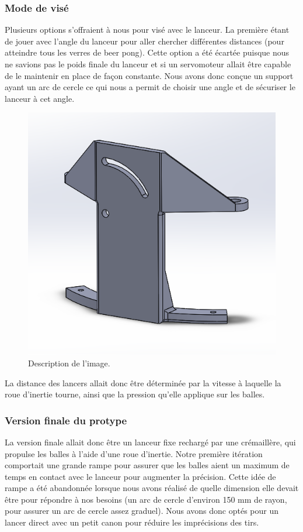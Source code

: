 \subsubsection{Mode de visé}
Plusieurs options s’offraient à nous pour visé avec le lanceur.
La première étant de jouer avec l’angle du lanceur pour aller chercher différentes distances (pour atteindre tous les verres de beer pong).
Cette option a été écartée puisque nous ne savions pas le poids finale du lanceur et si un servomoteur allait être capable de le maintenir en place de façon constante.
Nous avons donc conçue un support ayant un arc de cercle ce qui nous a permit de choisir une angle et de sécuriser le lanceur à cet angle.

\begin{figure}[h!]
    \centering
    \includegraphics[width=0.5\linewidth]{img/s2/cad/support}
    \caption{Description de l'image.}
    \label{fig:s2-cad-support}
\end{figure}

La distance des lancers allait donc être déterminée par la vitesse à laquelle la roue d’inertie tourne, ainsi que la pression qu’elle applique sur les balles.

\subsubsection{Version finale du protype}
La version finale allait donc être un lanceur fixe rechargé par une crémaillère, qui propulse les balles à l’aide d’une roue d’inertie.
Notre première itération comportait une grande rampe pour assurer que les balles aient un maximum de temps en contact avec le lanceur pour augmenter la précision.
Cette idée de rampe a été abandonnée lorsque nous avons réalisé de quelle dimension elle devait être pour répondre à nos besoins (un arc de cercle d’environ 150 mm de rayon, pour assurer un arc de cercle assez graduel).
Nous avons donc optés pour un lancer direct avec un petit canon pour réduire les imprécisions des tirs.

